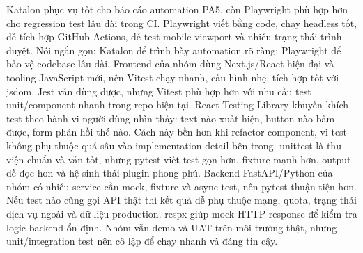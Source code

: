 {}
\markdownRendererSectionEnd \markdownRendererSectionBegin
{}\markdownRendererInterblockSeparator
{}Katalon phục vụ tốt cho báo cáo automation PA5, còn Playwright phù hợp hơn cho regression test lâu dài trong CI.\markdownRendererParagraphSeparator
{}Playwright viết bằng code, chạy headless tốt, dễ tích hợp GitHub Actions, dễ test mobile viewport và nhiều trạng thái trình duyệt.\markdownRendererParagraphSeparator
{}Nói ngắn gọn: Katalon để trình bày automation rõ ràng; Playwright để bảo vệ codebase lâu dài.\markdownRendererInterblockSeparator
{}
\markdownRendererSectionEnd \markdownRendererSectionBegin
{}\markdownRendererInterblockSeparator
{}Frontend của nhóm dùng Next.js/React hiện đại và tooling JavaScript mới, nên Vitest chạy nhanh, cấu hình nhẹ, tích hợp tốt với jsdom.\markdownRendererParagraphSeparator
{}Jest vẫn dùng được, nhưng Vitest phù hợp hơn với nhu cầu test unit/component nhanh trong repo hiện tại.\markdownRendererInterblockSeparator
{}
\markdownRendererSectionEnd \markdownRendererSectionBegin
{}\markdownRendererInterblockSeparator
{}React Testing Library khuyến khích test theo hành vi người dùng nhìn thấy: text nào xuất hiện, button nào bấm được, form phản hồi thế nào.\markdownRendererParagraphSeparator
{}Cách này bền hơn khi refactor component, vì test không phụ thuộc quá sâu vào implementation detail bên trong.\markdownRendererInterblockSeparator
{}
\markdownRendererSectionEnd \markdownRendererSectionBegin
{}\markdownRendererInterblockSeparator
{}unittest là thư viện chuẩn và vẫn tốt, nhưng pytest viết test gọn hơn, fixture mạnh hơn, output dễ đọc hơn và hệ sinh thái plugin phong phú.\markdownRendererParagraphSeparator
{}Backend FastAPI/Python của nhóm có nhiều service cần mock, fixture và async test, nên pytest thuận tiện hơn.\markdownRendererInterblockSeparator
{}
\markdownRendererSectionEnd \markdownRendererSectionBegin
{}\markdownRendererInterblockSeparator
{}Nếu test nào cũng gọi API thật thì kết quả dễ phụ thuộc mạng, quota, trạng thái dịch vụ ngoài và dữ liệu production.\markdownRendererParagraphSeparator
{}respx giúp mock HTTP response để kiểm tra logic backend ổn định. Nhóm vẫn demo và UAT trên môi trường thật, nhưng unit/integration test nên cô lập để chạy nhanh và đáng tin cậy.\markdownRendererInterblockSeparator
